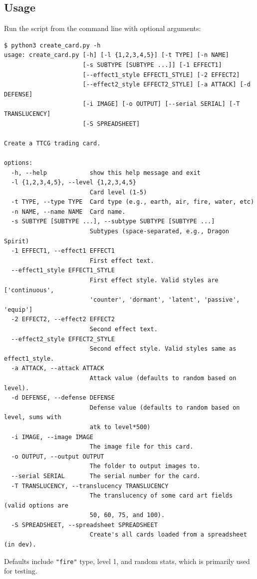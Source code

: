 \subsection{Usage}
Run the script from the command line with optional arguments:
\begin{lstlisting}[style=terminalstyle]
$ python3 create_card.py -h
usage: create_card.py [-h] [-l {1,2,3,4,5}] [-t TYPE] [-n NAME]
                      [-s SUBTYPE [SUBTYPE ...]] [-1 EFFECT1]
                      [--effect1_style EFFECT1_STYLE] [-2 EFFECT2]
                      [--effect2_style EFFECT2_STYLE] [-a ATTACK] [-d DEFENSE]
                      [-i IMAGE] [-o OUTPUT] [--serial SERIAL] [-T TRANSLUCENCY]
                      [-S SPREADSHEET]

Create a TTCG trading card.

options:
  -h, --help            show this help message and exit
  -l {1,2,3,4,5}, --level {1,2,3,4,5}
                        Card level (1-5)
  -t TYPE, --type TYPE  Card type (e.g., earth, air, fire, water, etc)
  -n NAME, --name NAME  Card name.
  -s SUBTYPE [SUBTYPE ...], --subtype SUBTYPE [SUBTYPE ...]
                        Subtypes (space-separated, e.g., Dragon Spirit)
  -1 EFFECT1, --effect1 EFFECT1
                        First effect text.
  --effect1_style EFFECT1_STYLE
                        First effect style. Valid styles are ['continuous',
                        'counter', 'dormant', 'latent', 'passive', 'equip']
  -2 EFFECT2, --effect2 EFFECT2
                        Second effect text.
  --effect2_style EFFECT2_STYLE
                        Second effect style. Valid styles same as effect1_style.
  -a ATTACK, --attack ATTACK
                        Attack value (defaults to random based on level).
  -d DEFENSE, --defense DEFENSE
                        Defense value (defaults to random based on level, sums with
                        atk to level*500)
  -i IMAGE, --image IMAGE
                        The image file for this card.
  -o OUTPUT, --output OUTPUT
                        The folder to output images to.
  --serial SERIAL       The serial number for the card.
  -T TRANSLUCENCY, --translucency TRANSLUCENCY
                        The translucency of some card art fields (valid options are
                        50, 60, 75, and 100).
  -S SPREADSHEET, --spreadsheet SPREADSHEET
                        Create's all cards loaded from a spreadsheet (in dev).

\end{lstlisting}
Defaults include \texttt{"fire"} type, level 1, and random stats, which is primarily used for testing.


